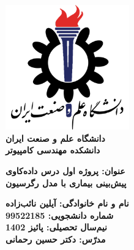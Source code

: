 \begin{titlepage}
\begin{center}
\includegraphics[width=0.4\textwidth]{IUSTLogo.png}\\
        
\LARGE
\textbf{دانشگاه علم و صنعت ایران}\\
\textbf{دانشکده مهندسی کامپیوتر}\\
        
\vfill
        
\huge
\textbf{عنوان: پروژه اول درس داده‌کاوی}\\
\textbf{پیش‌بینی بیماری با مدل رگرسیون}\\
\vfill
        
\LARGE
\textbf{نام و نام خانوادگی: آیلین نائب‌زاده }\\
\textbf{شماره دانشجویی: 99522185}\\
\textbf{نیم‌سال تحصیلی: پائیز 1402}\\
\textbf{مدرّس: دکتر حسین رحمانی}\\
\end{center}
\end{titlepage}
